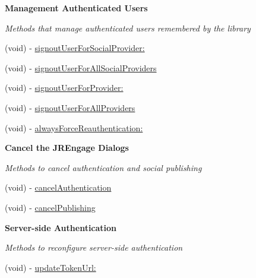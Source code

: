\begin{Indent}{\bf Management Authenticated Users}\par
{\em \label{_amgrp4247d2361fbfb57c620ed69782a50c95}
 Methods that manage authenticated users remembered by the library }\begin{DoxyCompactItemize}
\item 
(void) -\/ \hyperlink{interface_j_r_engage_aede9ed92d80f14d85e59a982da3150fc}{signoutUserForSocialProvider:}
\item 
(void) -\/ \hyperlink{interface_j_r_engage_a1f4e27ed5dbc05892fd7bc2255d2afa8}{signoutUserForAllSocialProviders}
\item 
(void) -\/ \hyperlink{interface_j_r_engage_af1448791663265d3b739041983fbae92}{signoutUserForProvider:}
\item 
(void) -\/ \hyperlink{interface_j_r_engage_a56060e8d5fe94e4bf06ff3edf27af5ee}{signoutUserForAllProviders}
\item 
(void) -\/ \hyperlink{interface_j_r_engage_a66dca1abdfd5103480f9a87f65923a68}{alwaysForceReauthentication:}
\end{DoxyCompactItemize}
\end{Indent}
\begin{Indent}{\bf Cancel the JREngage Dialogs}\par
{\em \label{_amgrpd07ee85d05cc5dd13dd0e31682479a39}
 Methods to cancel authentication and social publishing }\begin{DoxyCompactItemize}
\item 
(void) -\/ \hyperlink{interface_j_r_engage_a17b67c9bb98230fb7d59f8c35a20662b}{cancelAuthentication}
\item 
(void) -\/ \hyperlink{interface_j_r_engage_a205c368338061976178a5b0e36f2d4f2}{cancelPublishing}
\end{DoxyCompactItemize}
\end{Indent}
\begin{Indent}{\bf Server-\/side Authentication}\par
{\em \label{_amgrp1fc6cae7bdf84f91a0bad45f5891f15e}
 Methods to reconfigure server-\/side authentication }\begin{DoxyCompactItemize}
\item 
(void) -\/ \hyperlink{interface_j_r_engage_ac0fb45ee43767dfdea0057bb93000db6}{updateTokenUrl:}
\end{DoxyCompactItemize}
\end{Indent}


